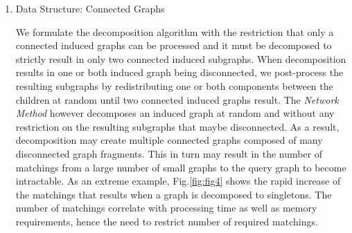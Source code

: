 \begin{enumerate}
\begin{enumerate}



\item Data Structure: Connected Graphs

We formulate the decomposition algorithm with the restriction that only a connected induced graphs can be processed and it must be decomposed to strictly result in only two connected induced subgraphs. 
When decomposition results in one or both induced graph being disconnected, we post-process the resulting subgraphs by redistributing one or both components between the children at random until two connected induced graphs result.
The \textit{Network Method} however decomposes an induced graph at random and without any restriction on the resulting subgraphs that maybe disconnected.
As a result, decomposition may create multiple connected graphs composed of many disconnected graph fragments. 
This in turn may result in the number of matchings from a large number of small graphs to the query graph to become intractable.
As an extreme example, Fig.\ref{fig:fig4} shows the rapid increase of the matchings that results when a graph is decomposed to singletons.
The number of matchings correlate with processing time as well as memory requirements, hence the need to restrict number of required matchings. 



\end{enumerate}
\end{enumerate}
